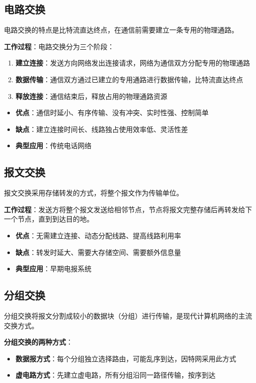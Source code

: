 \subsection{电路交换}
电路交换的特点是比特流直达终点，在通信前需要建立一条专用的物理通路。

\textbf{工作过程}：电路交换分为三个阶段：
\begin{enumerate}[leftmargin=2em,itemsep=0pt]
    \item \textbf{建立连接}：发送方向网络发出连接请求，网络为通信双方分配专用的物理通路
    \item \textbf{数据传输}：通信双方通过已建立的专用通路进行数据传输，比特流直达终点
    \item \textbf{释放连接}：通信结束后，释放占用的物理通路资源
\end{enumerate}

\begin{itemize}[leftmargin=2em,itemsep=0pt]
    \item \textbf{优点}：通信时延小、有序传输、没有冲突、实时性强、控制简单
    \item \textbf{缺点}：建立连接时间长、线路独占使用效率低、灵活性差
    \item \textbf{典型应用}：传统电话网络
\end{itemize}

\subsection{报文交换}
报文交换采用存储转发的方式，将整个报文作为传输单位。

\textbf{工作过程}：发送方将整个报文发送给相邻节点，节点将报文完整存储后再转发给下一个节点，直到到达目的地。

\begin{itemize}[leftmargin=2em,itemsep=0pt]
    \item \textbf{优点}：无需建立连接、动态分配线路、提高线路利用率
    \item \textbf{缺点}：转发时延大、需要大存储空间、需要额外信息量
    \item \textbf{典型应用}：早期电报系统
\end{itemize}

\subsection{分组交换}
分组交换将报文分割成较小的数据块（分组）进行传输，是现代计算机网络的主流交换方式。

\textbf{分组交换的两种方式}：
\begin{itemize}[leftmargin=2em,itemsep=0pt]
    \item \textbf{数据报方式}：每个分组独立选择路由，可能乱序到达，因特网采用此方式
    \item \textbf{虚电路方式}：先建立虚电路，所有分组沿同一路径传输，按序到达
\end{itemize}

